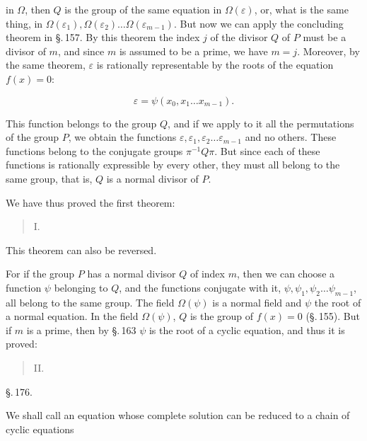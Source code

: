 in $\Omega$, then $Q$ is the group of the same equation in $\Omega(\varepsilon)$, or,
what is the same thing, in $\Omega(\varepsilon_1), \Omega(\varepsilon_2) \ldots \Omega(\varepsilon_{m-1})$. But now we can
apply the concluding theorem in \S.\,157. By this theorem the
index $j$ of the divisor $Q$ of $P$ must be a divisor of $m$, and
since $m$ is assumed to be a prime, we have $m = j$. Moreover, by
the same theorem, $\varepsilon$ is rationally representable by the roots of the
equation $f(x) = 0$:

\[
\varepsilon = \psi(x_0, x_1 \ldots x_{m-1}).
\]

This function belongs to the group $Q$, and if we apply to it
all the permutations of the group $P$, we obtain
the functions $\varepsilon, \varepsilon_1, \varepsilon_2 \ldots \varepsilon_{m-1}$ and no others. These
functions belong to the conjugate groups $\pi^{-1}Q\pi$. But since
each of these functions is rationally expressible by every other,
they must all belong to the same group,
that is, $Q$ is a normal divisor of $P$.

We have thus proved the first theorem:

\begin{quote}
\noindent I.\ 
\end{quote}

This theorem can also be reversed.

For if the group $P$ has a normal divisor $Q$ of
index $m$, then we can choose a function $\psi$ belonging to $Q$,
and the functions conjugate with it, $\psi, \psi_1, \psi_2 \ldots \psi_{m-1}$,
all belong to the same group. The field $\Omega(\psi)$ is a
normal field and $\psi$ the root of a normal equation. In the
field $\Omega(\psi)$, $Q$ is the group of $f(x) = 0$ (\S.\,155). But if
$m$ is a prime, then by \S.\,163 $\psi$ is the root of a
cyclic equation, and thus it is proved:

\begin{quote}
\noindent II.\ 
\end{quote}

\begin{center}
\S.\,176.

\end{center}

We shall call an equation whose complete solution can be
reduced to a chain of cyclic equations
